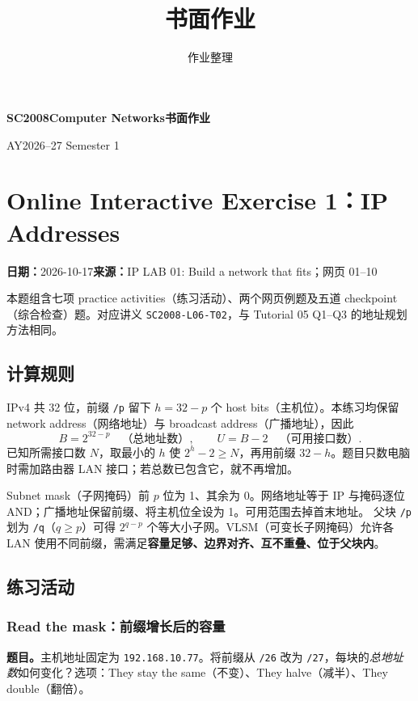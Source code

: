 \documentclass[11pt,a4paper,fontset=fandol]{ctexart}
\title{\textcolor{ntuRed}{\coursecode}\\[0.4em]\coursetitle\\[0.8em]\large 书面作业}
\author{作业整理}
\newcommand{\coursecode}{SC2008}
\newcommand{\coursetitle}{Computer Networks}
\newcommand{\academicyear}{AY2026--27 Semester 1}
\renewcommand{\exercisequestion}[2]{%
  \Needspace{5\baselineskip}%
  \subsubsection{#2}\label{exercise:#1}%
}
\renewcommand{\exercisemeta}[5]{%
  {\small\textbf{日期：}#2\quad\textbf{来源：}#3\par}%
}
\begin{document}
\begin{center}
  {\Large\bfseries\textcolor{ntuRed}{\coursecode}\quad\coursetitle\quad 书面作业\par}
  {\small\academicyear\par}
\end{center}

\section{Online Interactive Exercise 1：IP Addresses}
\label{homework:SC2008-HW01}
\exercisemeta
  {SC2008-HW01}
  {2026-10-17}
  {IP LAB 01: Build a network that fits；网页 01--10}
  {练习与 checkpoint 已完成；依据题面、反馈及计算核对}
  {已确认提交}

本题组含七项 practice activities（练习活动）、两个网页例题及五道 checkpoint（综合检查）题。对应讲义 \texttt{SC2008-L06-T02}，与 Tutorial 05 Q1--Q3 的地址规划方法相同。

\subsection{计算规则}

IPv4 共 32 位，前缀 \texttt{/p} 留下 $h=32-p$ 个 host bits（主机位）。本练习均保留 network address（网络地址）与 broadcast address（广播地址），因此
\[
  B=2^{32-p}\quad\text{（总地址数）},\qquad U=B-2\quad\text{（可用接口数）}.
\]
已知所需接口数 $N$，取最小的 $h$ 使 $2^h-2\geq N$，再用前缀 $32-h$。题目只数电脑时需加路由器 LAN 接口；若总数已包含它，就不再增加。

Subnet mask（子网掩码）前 $p$ 位为 1、其余为 0。网络地址等于 IP 与掩码逐位 AND；广播地址保留前缀、将主机位全设为 1。可用范围去掉首末地址。
父块 \texttt{/p} 划为 \texttt{/q}（$q\geq p$）可得 $2^{q-p}$ 个等大小子网。VLSM（可变长子网掩码）允许各 LAN 使用不同前缀，需满足\textbf{容量足够、边界对齐、互不重叠、位于父块内}。

\subsection{练习活动}

\exercisequestion{SC2008-HW01-Q01}{Read the mask：前缀增长后的容量}

\textbf{题目。}主机地址固定为 \texttt{192.168.10.77}。将前缀从 \texttt{/26} 改为 \texttt{/27}，每块的\emph{总地址数}如何变化？选项：They stay the same（不变）、They halve（减半）、They double（翻倍）。
\end{document}
